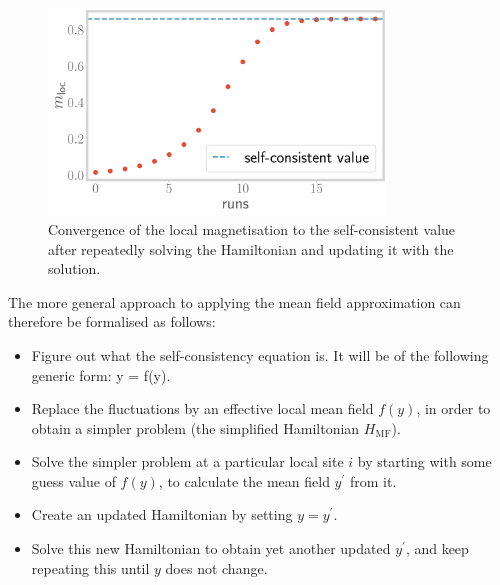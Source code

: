 \documentclass{article}
\begin{document}
\begin{figure}[htpb]
	\centering
	\includegraphics[width=0.8\textwidth]{ising_selfconsistency.pdf}
	\caption{Convergence of the local magnetisation to the self-consistent value after repeatedly solving the Hamiltonian and updating it with the solution.}
	\label{ising-selfconsistency}
\end{figure}

The more general approach to applying the mean field approximation can therefore be formalised as follows:
\begin{itemize}
	\item Figure out what the self-consistency equation is. It will be of the following generic form: y = f(y).
	\item Replace the fluctuations by an effective local mean field \(f(y)\), in order to obtain a simpler problem (the simplified Hamiltonian \(H_\text{MF}\)).
	\item Solve the simpler problem at a particular local site \(i\) by starting with some guess value of \(f(y)\), to calculate the mean field \(y^\prime\) from it.
	\item Create an updated Hamiltonian by setting \(y=y^\prime\).
	\item Solve this new Hamiltonian to obtain yet another updated \(y^\prime\), and keep repeating this until \(y\) does not change.
\end{itemize}
\end{document}
